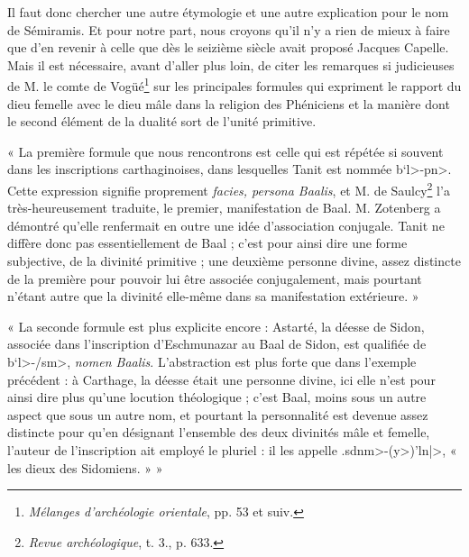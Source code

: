 \documentclass[a4paper, 11pt, oneside, landscape]{article}
\begin{document}
Il faut donc chercher une autre étymologie et une autre explication pour le nom de Sémiramis. Et pour notre part, nous croyons qu'il n'y a rien de mieux à faire que d'en revenir à celle que dès le seizième siècle avait proposé Jacques Capelle. Mais il est nécessaire, avant d'aller plus loin, de citer les remarques si judicieuses de M. le comte de Vogüé\footnote{\emph{Mélanges d'archéologie orientale}, pp. 53 et suiv.} sur les principales formules qui expriment le rapport du dieu femelle avec le dieu mâle dans la religion des Phéniciens et la manière dont le second élément de la dualité sort de l'unité primitive.

« La première formule que nous rencontrons est celle qui est répétée si souvent dans les inscriptions carthaginoises, dans lesquelles Tanit est nommée \<b`l>-\<pn>. Cette expression signifie proprement \emph{facies, persona Baalis}, et M. de Saulcy\footnote{\emph{Revue archéologique}, t. 3., p. 633.} l'a très-heureusement traduite, le premier, manifestation de Baal. M. Zotenberg a démontré qu'elle renfermait en outre une idée d'association conjugale. Tanit ne diffère donc pas essentiellement de Baal ; c'est pour ainsi dire une forme subjective, de la divinité primitive ; une deuxième personne divine, assez distincte de la première pour pouvoir lui être associée conjugalement, mais pourtant n'étant autre que la divinité elle-même dans sa manifestation extérieure. »

« La seconde formule est plus explicite encore : Astarté, la déesse de Sidon, associée dans l'inscription d'Eschmunazar au Baal de Sidon, est qualifiée de \<b`l>-\</sm>, \emph{nomen Baalis}. L'abstraction est plus forte que dans l'exemple précédent : à Carthage, la déesse était une personne divine, ici elle n'est pour ainsi dire plus qu'une locution théologique ; c'est Baal, moins sous un autre aspect que sous un autre nom, et pourtant la personnalité est devenue assez distincte pour qu'en désignant l'ensemble des deux divinités mâle et femelle, l'auteur de l'inscription ait employé le pluriel : il les appelle \<.sdnm>-(\<y>)\<'ln|>, « les dieux des Sidomiens. » »
\end{document}
